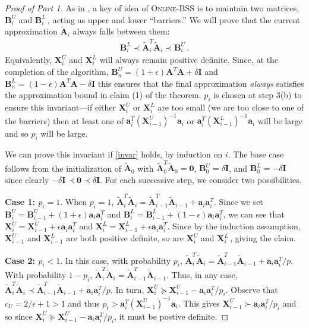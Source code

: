 \documentclass{toc}
\newcommand{\bv}[1]{\mathbf{#1}}
\begin{document}
\begin{proof}[Proof of  Part 1]
As in \cite{batson2012twice},
a key of idea of \textsc{Online-BSS} is to maintain two matrices, $\bv{B}^U_i$ and $\bv{B}^L_i$\,, acting as upper and lower ``barriers.''  We will prove that the current approximation $\bv{\tilde  A}_i$ always falls between them:
\begin{align}\label{invar}
\bv{B}^L_i \prec \bv{\tilde{A}}_i^T \bv{\tilde{A}}_i \prec \bv{B}^U_i\,.
\end{align}
%
Equivalently, $\bv{X}^U_i$ and $\bv{X}^L_i$ will always remain positive definite. Since, at the completion of the algorithm, $\bv{B}^U_n = (1+\epsilon) \bv{A}^T \bv{A} + \delta \bv{I}$ and $\bv{B}^L_n = (1-\epsilon) \bv{A}^T \bv{A} - \delta \bv{I}$ this ensures that the final approximation \emph{always} satisfies the approximation bound in claim (1) of the theorem. $p_i$ is chosen at step 3(b) to ensure this invariant---if either $\bv{X}^U_i$ or $\bv{X}^L_i$ are too small (we are too close to one of the barriers) then at least one of  $\bv{a}_i^T (\bv{X}^U_{i-1})^{-1} \bv{a}_i$ or $\bv{a}_i^T (\bv{X}^L_{i-1})^{-1} \bv{a}_i$ will be large and so $p_i$ will be large.

We can prove this invariant
%
if \eqref{invar} holds,  %
by induction on $i$.  The base case follows from the initialization of $\bv{\tilde{A}}_0$ with $\bv{\tilde{A}}_0^T \bv{\tilde{A}}_0 = \bv{0}$, $\bv{B}^U_0 = \delta \bv{I}$, and $\bv{B}^L_0 = -\delta \bv{I}$ since clearly $-\delta \bv I \prec \bv{0} \prec \delta \bv{I}$.  For each successive step, we consider two possibilities.

\textbf{Case 1: $p_i = 1$}.  When $p_i =1$, $\bv{\tilde{A}}_i^T \bv{\tilde{A}}_i = \bv{\tilde{A}}_{i-1}^T \bv{\tilde{A}}_{i-1} + \bv{a}_i \bv{a}_i^T$. Since we set  $\bv{B}_i^U = \bv{B}_{i-1}^U + (1+\epsilon) \bv{a}_i \bv{a}_i^T$ and $\bv{B}_i^L = \bv{B}_{i-1}^L + (1-\epsilon) \bv{a}_i \bv{a}_i^T$, we can see that $\bv{X}_i^U = \bv{X}_{i-1}^U + \epsilon \bv{a}_i \bv{a}_i^T $ and $\bv{X}_i^L = \bv{X}_{i-1}^L + \epsilon \bv{a}_i \bv{a}_i^T $. Since by the induction assumption, $ \bv{X}_{i-1}^U$ and $ \bv{X}_{i-1}^L$ are both positive definite, so are $ \bv{X}_{i}^U$ and $ \bv{X}_{i}^L$\,, giving the claim.

\textbf{Case 2:  $p_i < 1$}. In this case, with probability $p_i$, $\bv{\tilde{A}}_i^T \bv{\tilde{A}}_i = \bv{\tilde{A}}_{i-1}^T \bv{\tilde{A}}_{i-1} +  \bv{a}_i \bv{a}_i^T/p$. With probability $1-p_i$, $\bv{\tilde{A}}_i^T \bv{\tilde{A}}_i = \bv{\tilde{A}}_{i-1}^T \bv{\tilde{A}}_{i-1}$. Thus, in any case,  $\bv{\tilde{A}}_i^T \bv{\tilde{A}}_i \prec \bv{\tilde{A}}_{i-1}^T \bv{\tilde{A}}_{i-1} + \bv{a}_i \bv{a}_i^T/p$. In turn, $\bv{X}_{i}^U \succeq \bv{X}_{i-1}^U -{\bv{a}_i \bv{a}_i^T}/{p_i}$. 
Observe that $c_U = 2/\epsilon + 1 > 1$ and thus $p_i >   \bv{a}_i^T (\bv{X}^U_{i-1})^{-1} \bv{a}_i$. This gives $\bv{X}^U_{i-1} \succ{\bv{a}_i \bv{a}_i^T}/{p_i}$ and so since $\bv{X}_i^U  \succeq \bv{X}_{i-1}^U -{\bv{a}_i \bv{a}_i^T}/{p_i}$, it must be postive definite. 


\end{proof}
\end{document}

